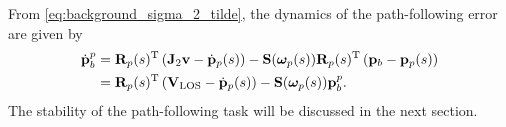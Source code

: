 From \eqref{eq:background_sigma_2_tilde}, the dynamics of the path-following error are given by
\begin{equation}
    \begin{split}
        \dot{\mathbf{p}}_b^p &= \mathbf{R}_p(s)^{\mathrm{T}} \left(\mathbf{J}_2 \mathbf{v} - \dot{\mathbf{p}}_p(s)\right) - \mathbf{S}(\bm{\omega}_p(s))\mathbf{R}_p(s)^{\mathrm{T}}\left(\mathbf{p}_b - \mathbf{p}_p(s)\right) \\
        &= \mathbf{R}_p(s)^{\mathrm{T}} \left(\mathbf{V}_{\rm LOS} - \dot{\mathbf{p}}_p(s)\right) - \mathbf{S}(\bm{\omega}_p(s))\mathbf{p}_b^p.
    \end{split}
\end{equation}
The stability of the path-following task will be discussed in the next section.
